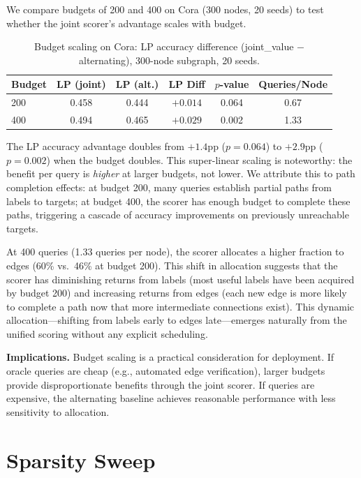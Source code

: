 \documentclass[12pt,a4paper,oneside]{report}
\begin{document}
We compare budgets of 200 and 400 on Cora (300 nodes, 20 seeds) to test whether the joint scorer's advantage scales with budget.

\begin{table}[htbp]
\centering
\caption{Budget scaling on Cora: LP accuracy difference (joint\_value $-$ alternating), 300-node subgraph, 20 seeds.}
\label{tab:budget}
\small
\begin{tabular}{lccccc}
\toprule
Budget & LP (joint) & LP (alt.) & LP Diff & $p$-value & Queries/Node \\
\midrule
200 & 0.458 & 0.444 & $+0.014$ & 0.064 & 0.67 \\
400 & 0.494 & 0.465 & $+0.029$ & 0.002 & 1.33 \\
\bottomrule
\end{tabular}
\end{table}

The LP accuracy advantage doubles from $+1.4$pp ($p = 0.064$) to $+2.9$pp ($p = 0.002$) when the budget doubles. This super-linear scaling is noteworthy: the benefit per query is \emph{higher} at larger budgets, not lower. We attribute this to path completion effects: at budget 200, many queries establish partial paths from labels to targets; at budget 400, the scorer has enough budget to complete these paths, triggering a cascade of accuracy improvements on previously unreachable targets.

At 400 queries (1.33 queries per node), the scorer allocates a higher fraction to edges (60\% vs.\ 46\% at budget 200). This shift in allocation suggests that the scorer has diminishing returns from labels (most useful labels have been acquired by budget 200) and increasing returns from edges (each new edge is more likely to complete a path now that more intermediate connections exist). This dynamic allocation---shifting from labels early to edges late---emerges naturally from the unified scoring without any explicit scheduling.

\textbf{Implications.} Budget scaling is a practical consideration for deployment. If oracle queries are cheap (e.g., automated edge verification), larger budgets provide disproportionate benefits through the joint scorer. If queries are expensive, the alternating baseline achieves reasonable performance with less sensitivity to allocation.

\section{Sparsity Sweep}
\end{document}
